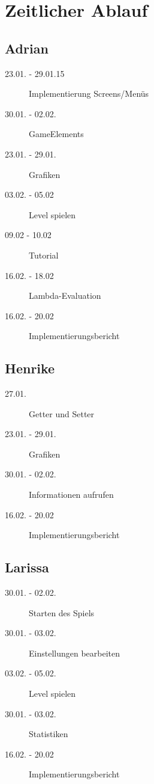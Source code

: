 \documentclass[parskip=full]{scrreprt}
\begin{document}
\chapter{Zeitlicher Ablauf}

\section{Adrian}

\begin{description}
	\item[23.01. - 29.01.15] Implementierung Screens/Menüs
	\item[30.01. - 02.02.] GameElements
	\item[23.01. - 29.01.] Grafiken
	\item[03.02. - 05.02] Level spielen
	\item[09.02 - 10.02] Tutorial
	\item[16.02. - 18.02] Lambda-Evaluation
	\item[16.02. - 20.02] Implementierungsbericht
\end{description}

\section{Henrike}

\begin{description}
\item[27.01.] Getter und Setter
\item[23.01. - 29.01.] Grafiken
\item[30.01. - 02.02.] Informationen aufrufen
\item[16.02. - 20.02] Implementierungsbericht
\end{description}

\section{Larissa}
\begin{description}
\item[30.01. - 02.02.] Starten des Spiels
\item[30.01. - 03.02.] Einstellungen bearbeiten
\item[03.02. - 05.02.] Level spielen
\item[30.01. - 03.02.] Statistiken
\item[16.02. - 20.02] Implementierungsbericht
\end{description}
\end{document}
